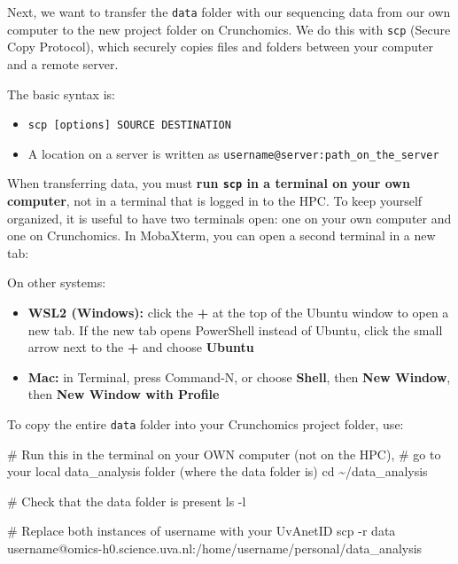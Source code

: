 \documentclass[
  letterpaper,
  DIV=11,
  numbers=noendperiod]{scrreprt}
\newenvironment{Shaded}{}{}
\newcommand{\AttributeTok}[1]{\textcolor[rgb]{0.84,0.23,0.29}{#1}}
\newcommand{\BuiltInTok}[1]{\textcolor[rgb]{0.84,0.23,0.29}{#1}}
\newcommand{\CommentTok}[1]{\textcolor[rgb]{0.42,0.45,0.49}{#1}}
\newcommand{\FunctionTok}[1]{\textcolor[rgb]{0.44,0.26,0.76}{#1}}
\newcommand{\NormalTok}[1]{\textcolor[rgb]{0.14,0.16,0.18}{#1}}
\providecommand{\tightlist}{%
  \setlength{\itemsep}{0pt}\setlength{\parskip}{0pt}}
\begin{document}
Next, we want to transfer the \texttt{data} folder with our sequencing
data from our own computer to the new project folder on Crunchomics. We
do this with \texttt{scp} (Secure Copy Protocol), which securely copies
files and folders between your computer and a remote server.

The basic syntax is:

\begin{itemize}
\tightlist
\item
  \texttt{scp\ {[}options{]}\ SOURCE\ DESTINATION}
\item
  A location on a server is written as
  \texttt{username@server:path\_on\_the\_server}
\end{itemize}

When transferring data, you must \textbf{run \texttt{scp} in a terminal
on your own computer}, not in a terminal that is logged in to the HPC.
To keep yourself organized, it is useful to have two terminals open: one
on your own computer and one on Crunchomics. In MobaXterm, you can open
a second terminal in a new tab:

On other systems:

\begin{itemize}
\tightlist
\item
  \textbf{WSL2 (Windows):} click the \textbf{+} at the top of the Ubuntu
  window to open a new tab. If the new tab opens PowerShell instead of
  Ubuntu, click the small arrow next to the \textbf{+} and choose
  \textbf{Ubuntu}
\item
  \textbf{Mac:} in Terminal, press Command-N, or choose \textbf{Shell},
  then \textbf{New Window}, then \textbf{New Window with Profile}
\end{itemize}

To copy the entire \texttt{data} folder into your Crunchomics project
folder, use:

\begin{Shaded}
\begin{Highlighting}[]
\CommentTok{\# Run this in the terminal on your OWN computer (not on the HPC),}
\CommentTok{\# go to your local data\_analysis folder (where the data folder is)}
\BuiltInTok{cd}\NormalTok{ \textasciitilde{}/data\_analysis}

\CommentTok{\# Check that the data folder is present }
\FunctionTok{ls} \AttributeTok{{-}l}

\CommentTok{\# Replace both instances of \textquotesingle{}username\textquotesingle{} with your UvAnetID}
\FunctionTok{scp} \AttributeTok{{-}r}\NormalTok{ data username@omics{-}h0.science.uva.nl:/home/username/personal/data\_analysis}
\end{Highlighting}
\end{Shaded}
\end{document}
